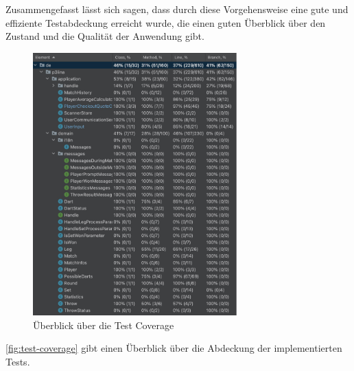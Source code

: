 Zusammengefasst lässt sich sagen, dass durch diese Vorgehensweise eine gute und effiziente Testabdeckung erreicht wurde, die einen guten Überblick über den Zustand und die Qualität der Anwendung gibt.\newpage
\begin{figure}[ht]
    \centering
    \includegraphics[width=0.7\textwidth]{Bilder/testCoverage.png}
    \caption{Überblick über die Test Coverage}
    \label{fig:test-coverage}
\end{figure}
\autoref{fig:test-coverage} gibt einen Überblick über die Abdeckung der implementierten Tests.\newpage
